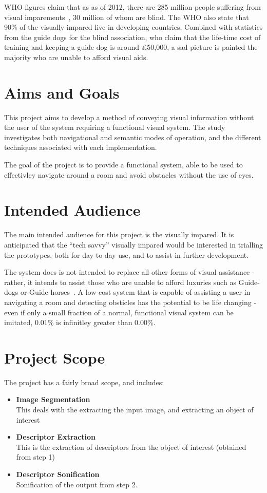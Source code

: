\ac{WHO} figures claim that as as of 2012, there are 285 million people suffering from visual imparements~\cite{whoblindness}, 30 million of whom are blind. The \ac{WHO} also state that 90\% of the visually impared live in developing countries. Combined with statistics from the guide dogs for the blind association, who claim that the life-time cost of training and keeping a guide dog is around £50,000, a sad picture is painted the majority who are unable to afford visual aids.

\section{Aims and Goals}
This project aims to develop a method of conveying visual information without the user of the system requiring a functional visual system. The study investigates both navigational and semantic modes of operation, and the different techniques associated with each implementation.

The goal of the project is to provide a functional system, able to be used to effectivley navigate around a room and avoid obstacles without the use of eyes.  

\section{Intended Audience}
The main intended audience for this project is the visually impared. It is anticipated that the ``tech savvy'' visually impared would be interested in trialling the prototypes, both for day-to-day use, and to assist in further development.

The system does is not intended to replace all other forms of visual assistance - rather, it intends to assist those who are unable to afford luxuries such as Guide-dogs or Guide-horses~\cite{guidehorse}. A low-cost system that is capable of assisting a user in navigating a room and detecting obsticles has the potential to be life changing - even if only a small fraction of a normal, functional visual system can be imitated, 0.01\% is infinitley greater than 0.00\%.

\section{Project Scope}
The project has a fairly broad scope, and includes:
\begin{itemize}
    \item \textbf{Image Segmentation} \hfill \\
        This deals with the extracting the input image, and extracting an object of interest
    \item \textbf{Descriptor Extraction} \hfill \\
        This is the extraction of descriptors from the object of interest (obtained from step 1)
    \item \textbf{Descriptor Sonification} \hfill \\
        Sonification of the output from step 2.
\end{itemize}


